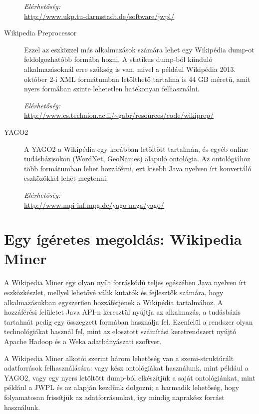 \begin{description}
\textit{Elérhetőség:}\\
\url{http://www.ukp.tu-darmstadt.de/software/jwpl/}

\item[Wikipedia Preprocessor] Ezzel az eszközzel más alkalmazások számára lehet egy Wikipédia dump-ot feldolgozhatóbb formába hozni. A statikus dump-ból kiinduló alkalmazásoknál erre szükség is van, mivel a például Wikipédia 2013. október 2-i XML formátumban letölthető tartalma is 44 GB méretű, amit nyers formában szinte lehetetlen hatékonyan felhasználni.
	
\textit{Elérhetőség:}\\
\url{http://www.cs.technion.ac.il/~gabr/resources/code/wikiprep/}

\item[YAGO2 \cite{yago2}] A YAGO2 a Wikipédia egy korábban letöltött tartalmán, és egyéb online tudásbázisokon (WordNet, GeoNames) alapuló ontológia. Az ontológiához több formátumban lehet hozzáférni, ezt kisebb Java nyelven írt konvertáló eszközökkel lehet megtenni.
	
\textit{Elérhetőség:}\\
\url{http://www.mpi-inf.mpg.de/yago-naga/yago/}
\end{description}

\section{Egy ígéretes megoldás: Wikipedia Miner}
\label{sec:wikipediaminer}

A Wikipedia Miner egy olyan nyílt forráskódú teljes egészében Java nyelven írt eszközkészlet, mellyel lehetővé válik kutatók és fejlesztők számára, hogy alkalmazásukban egyszerűen hozzáférjenek a Wikipédia tartalmához. A hozzáférési felületet Java API-n keresztül nyújtja az alkalmazás, a tudásbázis tartalmát pedig egy összegzett formában használja fel. Ezenfelül a rendszer olyan technológiákat használ fel, mint az elosztott számítási keretrendszert nyújtó Apache Hadoop és a Weka adatbányászati szoftver.

A Wikipedia Miner alkotói szerint három lehetőség van a szemi-struktúrált adatforrások felhasználására: vagy kész ontológiákat használunk, mint például a YAGO2, vagy egy nyers letöltött dump-ból elkészítjük a saját ontológiánkat, mint például a JWPL és az alapján kezdünk dolgozni; a harmadik lehetőség, hogy folyamatosan frissítjük az adatforrásunkat, így mindig naprakész forrást használunk.


